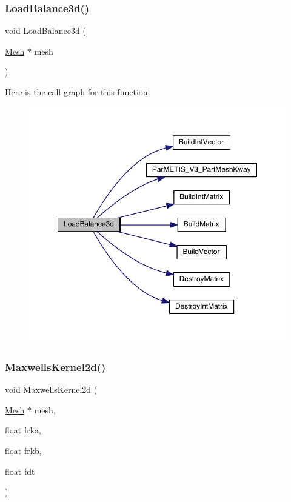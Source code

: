 \mbox{\label{a00554_a004c52e87250e61b258755469b25bbe9}} 
\subsubsection{\texorpdfstring{Load\+Balance3d()}{LoadBalance3d()}}
{\footnotesize\ttfamily void Load\+Balance3d (\begin{DoxyParamCaption}\item[{\hyperlink{a00557_aeffbe0891ab73a4d8964c9cb7978426e}{Mesh} $\ast$}]{mesh }\end{DoxyParamCaption})}

Here is the call graph for this function\+:\nopagebreak
\begin{figure}[H]
\begin{center}
\leavevmode
\includegraphics[width=350pt]{a00554_a004c52e87250e61b258755469b25bbe9_cgraph}
\end{center}
\end{figure}
\mbox{\label{a00554_a9db283bf2b7ea0ec1c4f6f898ef67f73}} 
\subsubsection{\texorpdfstring{Maxwells\+Kernel2d()}{MaxwellsKernel2d()}}
{\footnotesize\ttfamily void Maxwells\+Kernel2d (\begin{DoxyParamCaption}\item[{\hyperlink{a00557_aeffbe0891ab73a4d8964c9cb7978426e}{Mesh} $\ast$}]{mesh,  }\item[{float}]{frka,  }\item[{float}]{frkb,  }\item[{float}]{fdt }\end{DoxyParamCaption})}

